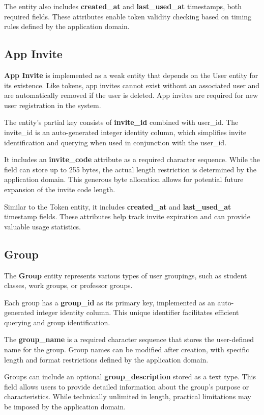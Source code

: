 \documentclass[a4paper,twoside,11pt]{article}
\begin{document}
The entity also includes \textbf{created\_at} and \textbf{last\_used\_at} timestamps, both required fields. These attributes enable token validity checking based on timing rules defined by the application domain.

\subsection{App Invite}
\textbf{App Invite} is implemented as a weak entity that depends on the User entity for its existence. Like tokens, app invites cannot exist without an associated user and are automatically removed if the user is deleted. App invites are required for new user registration in the system.

The entity's partial key consists of \textbf{invite\_id} combined with user\_id. The invite\_id is an auto-generated integer identity column, which simplifies invite identification and querying when used in conjunction with the user\_id.

It includes an \textbf{invite\_code} attribute as a required character sequence. While the field can store up to 255 bytes, the actual length restriction is determined by the application domain. This generous byte allocation allows for potential future expansion of the invite code length.

Similar to the Token entity, it includes \textbf{created\_at} and \textbf{last\_used\_at} timestamp fields. These attributes help track invite expiration and can provide valuable usage statistics.

\subsection{Group}
The \textbf{Group} entity represents various types of user groupings, such as student classes, work groups, or professor groups.

Each group has a \textbf{group\_id} as its primary key, implemented as an auto-generated integer identity column. This unique identifier facilitates efficient querying and group identification.

The \textbf{group\_name} is a required character sequence that stores the user-defined name for the group. Group names can be modified after creation, with specific length and format restrictions defined by the application domain.

Groups can include an optional \textbf{group\_description} stored as a text type. This field allows users to provide detailed information about the group's purpose or characteristics. While technically unlimited in length, practical limitations may be imposed by the application domain.
\end{document}
